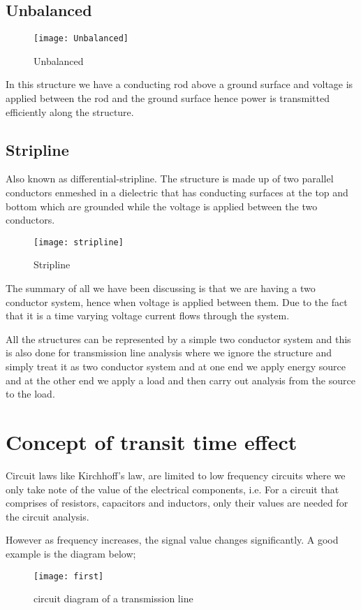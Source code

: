 	\subsection{Unbalanced}
		\begin{figure}[h]
		\centering
		\texttt{[image: Unbalanced]}
		\caption{ Unbalanced }
	\end{figure}
	 In this structure we have a conducting rod above a ground surface and voltage is applied between the rod and the ground surface hence power is transmitted efficiently along the structure.
	\subsection{Stripline} 
	Also known as differential-stripline. The structure is made up of two parallel conductors enmeshed in a dielectric that has conducting surfaces at the top and bottom which are grounded while the voltage is applied between the two conductors.
	\begin{figure}[h]
		\centering
		\texttt{[image: stripline]}
		\caption{ Stripline}
	\end{figure}

	The summary of all we have been discussing is that we are having a two conductor system, hence when voltage is applied between them. Due to the fact that it is a time varying voltage current flows through the system.
	
	All the structures can be represented by a simple two conductor system and this is also done for transmission line analysis where we ignore the structure and simply treat it as two conductor system and at one end we apply energy source and at the other end we apply a load and then carry out analysis from the source to the load.
	
	\section{Concept of transit time effect }
	Circuit laws like Kirchhoff’s law, are limited to low frequency circuits where we only take note of the value of the electrical components, i.e. For a circuit that comprises of resistors, capacitors and inductors, only their values are needed for the circuit analysis.
	
	However as frequency increases, the signal value changes significantly. A good example is the diagram below;

\begin{figure}[h]
	\centering
	\texttt{[image: first]}
	\caption{circuit diagram of a transmission line}
\end{figure}

